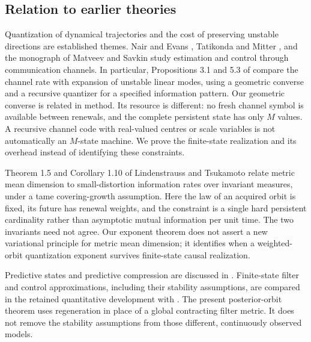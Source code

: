 \subsection{Relation to earlier theories}
Quantization of dynamical trajectories and the cost of preserving
unstable directions are established themes. Nair and Evans
\cite{NairEvans2000}, Tatikonda and Mitter \cite{TatikondaMitter2004},
and the monograph of Matveev and Savkin \cite{MatveevSavkin2009}
study estimation and control through communication channels. In
particular, Propositions 3.1 and 5.3 of
\cite{TatikondaMitter2004} compare the channel rate with expansion
of unstable linear modes, using a geometric converse and a recursive
quantizer for a specified information pattern. Our geometric converse
is related in method. Its resource is different: no fresh channel
symbol is available between renewals, and the complete persistent
state has only $M$ values. A recursive channel code with real-valued
centres or scale variables is not automatically an $M$-state machine.
We prove the finite-state realization and its overhead instead of
identifying these constraints.

Theorem 1.5 and Corollary 1.10 of Lindenstrauss and Tsukamoto
\cite{LindenstraussTsukamoto2018} relate metric mean dimension to
small-distortion information rates over invariant measures, under a
tame covering-growth assumption. Here the law of an acquired orbit
is fixed, its future has renewal weights, and the constraint is a
single hard persistent cardinality rather than asymptotic mutual
information per unit time. The two invariants need not agree.
Our exponent theorem does not assert a new variational principle
for metric mean dimension; it identifies when a weighted-orbit
quantization exponent survives finite-state causal realization.

Predictive states and predictive compression are discussed in
\cite{ShaliziCrutchfield2001,LittmanSuttonSingh2002,
MarzenCrutchfield2016,LoomisCrutchfield2022}. Finite-state filter and
control approximations, including their stability assumptions, are
compared in the retained quantitative development with
\cite{PagesPham2005,KalogeriasPetropulu2016,SaldiYukselLinder2017,
KaraYuksel2022,KBY2024,DKY2024}. The present posterior-orbit theorem
uses regeneration in place of a global contracting filter metric.
It does not remove the stability assumptions from those different,
continuously observed models.

